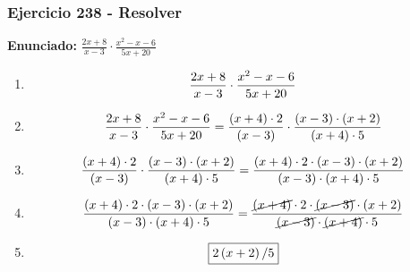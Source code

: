 \documentclass[11pt,a4paper]{article}
\newcommand{\fitmath}[1]{%
\[
\setbox0=\hbox{$\displaystyle #1$}%
\ifdim\wd0>\linewidth
\resizebox{\linewidth}{!}{$\displaystyle #1$}%
\else
#1%
\fi
\]
}
\begin{document}
\subsubsection*{Ejercicio 238 - Resolver}
\textbf{Enunciado:} $ \frac{2 x + 8}{x - 3} \cdot \frac{x^{2} - x - 6}{5 x + 20} $\par
\begin{enumerate}[leftmargin=2em]
\item \fitmath{\frac{2 x + 8}{x - 3} \cdot \frac{x^{2} - x - 6}{5 x + 20}}
\item \fitmath{\frac{2 x + 8}{x - 3} \cdot \frac{x^{2} - x - 6}{5 x + 20}= \frac{\left(x + 4\right)\cdot 2}{\left(x - 3\right)} \cdot \frac{\left(x - 3\right)\cdot \left(x + 2\right)}{\left(x + 4\right)\cdot 5}}
\item \fitmath{\frac{\left(x + 4\right)\cdot 2}{\left(x - 3\right)}\cdot \frac{\left(x - 3\right)\cdot \left(x + 2\right)}{\left(x + 4\right)\cdot 5}= \frac{\left(x + 4\right)\cdot 2\cdot \left(x - 3\right)\cdot \left(x + 2\right)}{\left(x - 3\right)\cdot \left(x + 4\right)\cdot 5}}
\item \fitmath{\frac{\left(x + 4\right)\cdot 2\cdot \left(x - 3\right)\cdot \left(x + 2\right)}{\left(x - 3\right)\cdot \left(x + 4\right)\cdot 5}= \frac{\cancel{\left(x + 4\right)}\cdot 2\cdot \cancel{\left(x - 3\right)}\cdot \left(x + 2\right)}{\cancel{\left(x - 3\right)}\cdot \cancel{\left(x + 4\right)}\cdot 5}}
\item \fitmath{\boxed{2 \left(x + 2\right) / 5}}
\end{enumerate}

\vspace{0.12cm}
\end{document}
